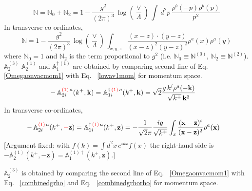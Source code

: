 \documentclass[aps,prd,amsmath,amssymb,nofootinbib]{revtex4-2}
\def\mf#1{\mathbb{#1}}
\numberwithin{equation}{section}
\begin{document}
\begin{equation}\label{Ncoeffmom}
    \mf{N} =  \mf{N}_0 +  \mf{N}_2 = 1- \frac{g^{2}}{(2\pi)^{3}}\, \log{\left(\frac{\vee}{\Lambda}\right)}\,\int\, d^{2}p\,\frac{\rho^{b}(-p)\rho^{b}(p)}{p^{2}}
\end{equation}
In transverse co-ordinates,
\begin{equation}\label{eq:Ncoeffpos}
    \mf{N}  = 1 -
    \frac{g^{2}}{(2\pi)^{3}}\, \log{\left(\frac{\vee}{\Lambda}\right)}\, \int_{x,y,z}\frac{(x-z)\cdot (y-z)}{(x-z)^{2}(y-z)^{2}}\rho^{a}(x)\rho^{a}(y)
\end{equation}
where  $ \mf{N}_0=1$ and  $\mf{N}_2$ is the term proportional to $g^2$ {\color{red}(i.e. $\mf{N}_0\equiv\mf{N}^{(0)}$, $\mf{N}_2\equiv\mf{N}^{(2)}$)}. {\color{orange}\sout{$\mf{A}^{(3)}_{2}$}} {\color{red}$\mf{A}^{(1)}_{2}$} and $\mf{A}^{\dagger\, (1)}_{1}$ are obtained by comparing second line of Eq.~ \eqref{Omegaonvacmom1} with Eq.~ \eqref{lowav1mom} for momentum space. 
\begin{align}
\label{A1coeffM}
  -\,\mf{A}^{{\color{red}(1)}\,a}_{2i}(k^{+},\mathbf{k}) =  \mf{A}^{\dagger\,{\color{red}(1)}\,a}_{ 1 i}(k^{+},\mathbf{k}) & = \sqrt{2} \frac{g\,k^{i}\rho^{a}(-\mathbf{k})}{ \sqrt{k^{+}}\,\mathbf{k}^{2}} 
\end{align}
In transverse co-ordinates,
\begin{align}
\label{A1coeff}
  -\, \mf{A}^{{\color{red}(1)}\,a}_{2i}(k^{+},{\color{red}-}\mathbf{z}) =   \mf{A}^{\dagger\,{\color{red}(1)}\,a}_{1 i}(k^{+},\mathbf{z}) & = - \frac{1}{\sqrt{2}\pi}\frac{ig}{\sqrt{k^+}}\int_{x}\frac{(\mathbf{x}-\mathbf{z})^{i}}{(\mathbf{x}-\mathbf{z})^{2}} \rho^{a}(\mathbf{x}) 
\end{align} {\color{red}[Argument fixed: with $f(k)=\int d^2x\,e^{ikx}f(x)$ the right-hand side is $-\mf{A}^{(1)}_2(k^+,-\mathbf{z})=\mf{A}^{(1)\dagger}_1(k^+,\mathbf{z})$.]}\par\noindent 
$ \mf{A}^{(3)}_{2}$ is obtained by comparing the second line of Eq.~ \eqref{Omegaonvacmom1} with Eq.~ \eqref{combinedgrho} and Eq.~ \eqref{combinedgrhorho} for momentum space. 
\end{document}
